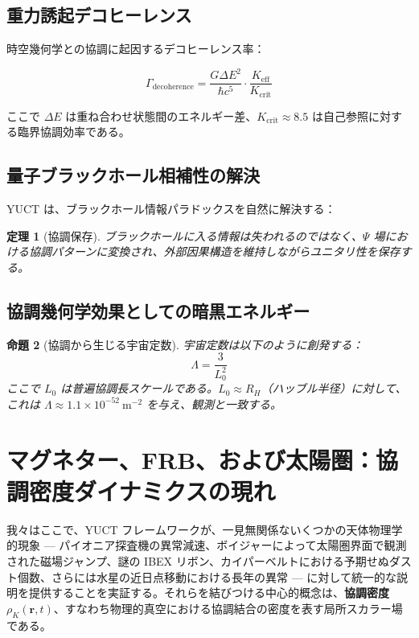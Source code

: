 \documentclass[11pt,a4paper]{article}
\newtheorem{theorem}{定理}[section]
\newtheorem{proposition}[theorem]{命題}
\theoremstyle{remark}
\newcommand{\Keff}{K_{\mathrm{eff}}}
\begin{document}
	\subsection{重力誘起デコヒーレンス}
	
	時空幾何学との協調に起因するデコヒーレンス率：
	
	\begin{equation}
		\Gamma_{\text{decoherence}} = \frac{G \Delta E^2}{\hbar c^5} \cdot \frac{\Keff}{K_{\text{crit}}}
	\end{equation}
	
	ここで $\Delta E$ は重ね合わせ状態間のエネルギー差、$K_{\text{crit}} \approx 8.5$ は自己参照に対する臨界協調効率である。
	
	\subsection{量子ブラックホール相補性の解決}
	
	YUCT は、ブラックホール情報パラドックスを自然に解決する：
	
	\begin{theorem}[協調保存]
		ブラックホールに入る情報は失われるのではなく、$\Psi$ 場における協調パターンに変換され、外部因果構造を維持しながらユニタリ性を保存する。
	\end{theorem}
	
	\subsection{協調幾何学効果としての暗黒エネルギー}
	
	\begin{proposition}[協調から生じる宇宙定数]
		宇宙定数は以下のように創発する：
		\[
		\Lambda = \frac{3}{L_0^2}
		\]
		ここで $L_0$ は普遍協調長スケールである。$L_0 \approx R_H$（ハッブル半径）に対して、これは $\Lambda \approx 1.1 \times 10^{-52}\ \text{m}^{-2}$ を与え、観測と一致する。
	\end{proposition}
	
	\section{マグネター、FRB、および太陽圏：協調密度ダイナミクスの現れ}
	\label{sec:coord_density}
	
	我々はここで、YUCT フレームワークが、一見無関係ないくつかの天体物理学的現象 — パイオニア探査機の異常減速、ボイジャーによって太陽圏界面で観測された磁場ジャンプ、謎の IBEX リボン、カイパーベルトにおける予期せぬダスト個数、さらには水星の近日点移動における長年の異常 — に対して統一的な説明を提供することを実証する。それらを結びつける中心的概念は、\textbf{協調密度} $\rho_K(\mathbf{r},t)$、すなわち物理的真空における協調結合の密度を表す局所スカラー場である。
	
\end{document}
